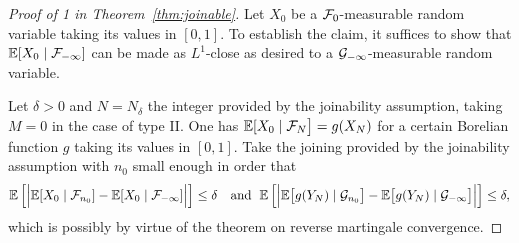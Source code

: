 \documentclass[12pt,a4paper]{article}
\begin{document}
\begin{proof}[Proof of 1 in Theorem~\ref{thm:joinable}]
Let $X_0$ be a $\mathcal{F}_0$-measurable random variable taking its values in $[0,1]$. 
To establish the claim, it suffices to show that 
$\mathbb{E}[X_{0} \mid \mathcal{F}_{-\infty}]$ can be made as $L^1$-close as desired to a 
$\mathcal{G}_{-\infty}$-measurable random variable. 

Let $\delta>0$ and $N = N_\delta$ the integer provided by the joinability assumption, 
taking $M=0$ in the case of type II. 
One has 
$\mathbb{E}[X_0 \mid \mathcal{F}_{N}\bigr] = g(X_{N})$ 
for a certain Borelian function $g$ taking its values in $[0,1]$. 
Take the joining provided by the joinability assumption with 
$n_0$ small enough in order that 
$$
\mathbb{E}\left[ \Bigr| 
\mathbb{E}[X_0 \mid \mathcal{F}_{n_0}] - \mathbb{E}[X_0 \mid \mathcal{F}_{-\infty}] 
\Bigl| \right] 
\leq \delta
\quad \text{and }\; 
\mathbb{E}\left[ \Bigr| 
\mathbb{E}\bigl[g(Y_N) \mid \mathcal{G}_{n_0}\bigr] - \mathbb{E}\bigl[g(Y_N) \mid \mathcal{G}_{-\infty}\bigr]
\Bigl| \right] 
\leq \delta,
$$
which is possibly by virtue of the theorem on reverse martingale convergence. 


\end{proof}
\end{document}
